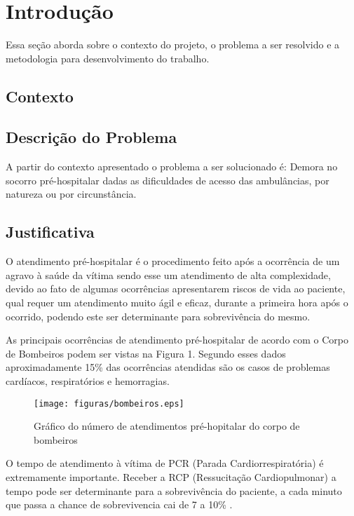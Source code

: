 \chapter[Introdução]{Introdução}\label{cap1}
	Essa seção aborda sobre o contexto do projeto, o problema a ser resolvido e a metodologia para desenvolvimento do trabalho. 
\section{Contexto}
  

\section{Descrição do Problema}

A partir do contexto apresentado o problema a ser solucionado é:
Demora no socorro pré-hospitalar dadas as dificuldades de acesso das ambulâncias, por natureza ou por circunstância.
  
\section{Justificativa}

O atendimento pré-hospitalar é o procedimento feito após a ocorrência de um agravo à saúde da vítima \cite{SBC} sendo esse um atendimento de alta complexidade, 
devido ao fato de algumas ocorrências apresentarem riscos de vida ao paciente, qual requer um atendimento muito ágil e eficaz, durante a primeira hora após o ocorrido, 
podendo este ser determinante para sobrevivência do mesmo.\cite{PQA} 

As principais ocorrências de atendimento pré-hospitalar de acordo com o Corpo de Bombeiros podem ser vistas na Figura 1. Segundo esses dados aproximadamente 15\% das ocorrências atendidas são os casos de problemas cardíacos, respiratórios e hemorragias.

 \begin{figure}[ht]
	\centering
		\texttt{[image: figuras/bombeiros.eps]}
	\caption{Gráfico do número de atendimentos pré-hopitalar do corpo de bombeiros}
\end{figure}

O tempo de atendimento à vítima de PCR (Parada Cardiorrespiratória) é extremamente importante. Receber a RCP (Ressucitação Cardiopulmonar) a tempo pode ser determinante para a sobrevivência do paciente, a cada minuto que passa a chance de sobrevivencia cai de 7 a 10\% \cite{SBC}. 

